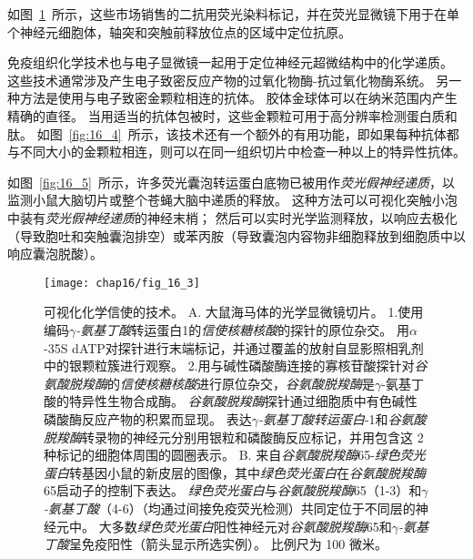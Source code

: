 \begin{proposition}[神经解剖学导航术语]
	\quad \quad 如图~\ref{fig:16_3}~所示，这些市场销售的二抗用荧光染料标记，并在荧光显微镜下用于在单个神经元细胞体，轴突和突触前释放位点的区域中定位抗原。
	
	\quad \quad 免疫组织化学技术也与电子显微镜一起用于定位神经元超微结构中的化学递质。
	这些技术通常涉及产生电子致密反应产物的过氧化物酶-抗过氧化物酶系统。
	另一种方法是使用与电子致密金颗粒相连的抗体。
	胶体金球体可以在纳米范围内产生精确的直径。
	当用适当的抗体包被时，这些金颗粒可用于高分辨率检测蛋白质和肽。
	如图~\ref{fig:16_4}~所示，该技术还有一个额外的有用功能，即如果每种抗体都与不同大小的金颗粒相连，则可以在同一组织切片中检查一种以上的特异性抗体。
	
	\quad \quad 如图~\ref{fig:16_5}~所示，许多荧光囊泡转运蛋白底物已被用作\textit{荧光假神经递质}，以监测小鼠大脑切片或整个苍蝇大脑中递质的释放。
	这种方法可以可视化突触小泡中装有\textit{荧光假神经递质}的神经末梢；
	然后可以实时光学监测释放，以响应去极化（导致胞吐和突触囊泡排空）或苯丙胺（导致囊泡内容物非细胞释放到细胞质中以响应囊泡脱酸）。
	
\end{proposition}


\begin{figure}[htbp]
	\centering
	\texttt{[image: chap16/fig\_16\_3]}
	\caption{可视化化学信使的技术。
		A. 大鼠海马体的光学显微镜切片。
		1.使用编码\textit{$\gamma$-氨基丁酸}转运蛋白1的\textit{信使核糖核酸}的探针的原位杂交。
		用$\alpha$-35S dATP对探针进行末端标记，并通过覆盖的放射自显影照相乳剂中的银颗粒簇进行观察。
		2.用与碱性磷酸酶连接的寡核苷酸探针对\textit{谷氨酸脱羧酶}的\textit{信使核糖核酸}进行原位杂交，\textit{谷氨酸脱羧酶}是$\gamma$-氨基丁酸的特异性生物合成酶。
		\textit{谷氨酸脱羧酶}探针通过细胞质中有色碱性磷酸酶反应产物的积累而显现。
		表达\textit{$\gamma$-氨基丁酸转运蛋白}-1和\textit{谷氨酸脱羧酶}转录物的神经元分别用银粒和磷酸酶反应标记，并用包含这 2 种标记的细胞体周围的圆圈表示。
		B. 来自\textit{谷氨酸脱羧酶}65-\textit{绿色荧光蛋白}转基因小鼠的新皮层的图像，其中\textit{绿色荧光蛋白}在\textit{谷氨酸脱羧酶}65启动子的控制下表达。
		\textit{绿色荧光蛋白}与\textit{谷氨酸脱羧酶}65（1-3）和\textit{$\gamma$-氨基丁酸}（4-6）（均通过间接免疫荧光检测）共同定位于不同层的神经元中。
		大多数\textit{绿色荧光蛋白}阳性神经元对\textit{谷氨酸脱羧酶}65和\textit{$\gamma$-氨基丁酸}呈免疫阳性（箭头显示所选实例）。
		比例尺为 100 微米。}
	\label{fig:16_3}
\end{figure}


